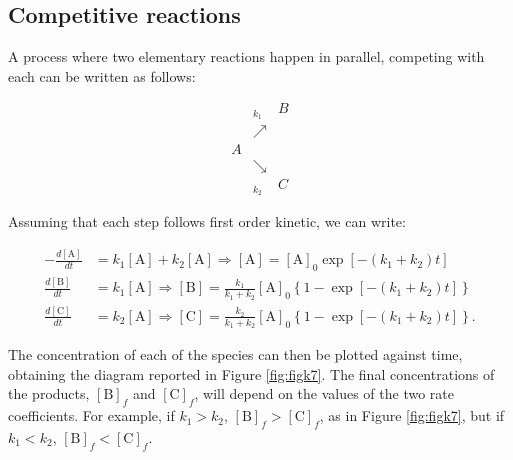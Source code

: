 \documentclass[
  9pt,
]{extbook}
\theoremstyle{definition}
\theoremstyle{definition}
\theoremstyle{definition}
\theoremstyle{remark}
\begin{document}
\hypertarget{competitive-reactions}{%
\subsection{Competitive reactions}\label{competitive-reactions}}

A process where two elementary reactions happen in parallel, competing with each can be written as follows:

\begin{equation}
\begin{matrix}
 &_{k_1}  & B\\
 &\nearrow & \\
A &   & \\
 &\searrow& \\
  &_{k_2}  & C
\end{matrix}
\end{equation}

Assuming that each step follows first order kinetic, we can write:

\begin{equation}
\begin{aligned}
-\frac{d[\mathrm{A}]}{dt} &=k_1 [\mathrm{A}]+k_2 [\mathrm{A}] \Rightarrow [\mathrm{A}]=[\mathrm{A}]_0\exp \left[ -(k_1+k_2)t \right] \\
\frac{d[\mathrm{B}]}{dt} &=k_1 [\mathrm{A}] \Rightarrow [\mathrm{B}]=\frac{k_1}{k_1+k_2}[\mathrm{A}]_0 \left\{ 1-\exp \left[ -(k_1+k_2)t \right] \right\} \\
\frac{d[\mathrm{C}]}{dt} &=k_2 [\mathrm{A}]\Rightarrow [\mathrm{C}]=\frac{k_2}{k_1+k_2}[\mathrm{A}]_0 \left\{ 1-\exp \left[ -(k_1+k_2)t \right] \right\}.
\end{aligned}
\label{eq:kincomp4b}
\end{equation}

The concentration of each of the species can then be plotted against time, obtaining the diagram reported in Figure \ref{fig:figk7}. The final concentrations of the products, \([\mathrm{B}]_f\) and \([\mathrm{C}]_f\), will depend on the values of the two rate coefficients. For example, if \(k_1>k_2\), \([\mathrm{B}]_f>[\mathrm{C}]_f\), as in Figure \ref{fig:figk7}, but if \(k_1<k_2\), \([\mathrm{B}]_f<[\mathrm{C}]_f\).
\end{document}
